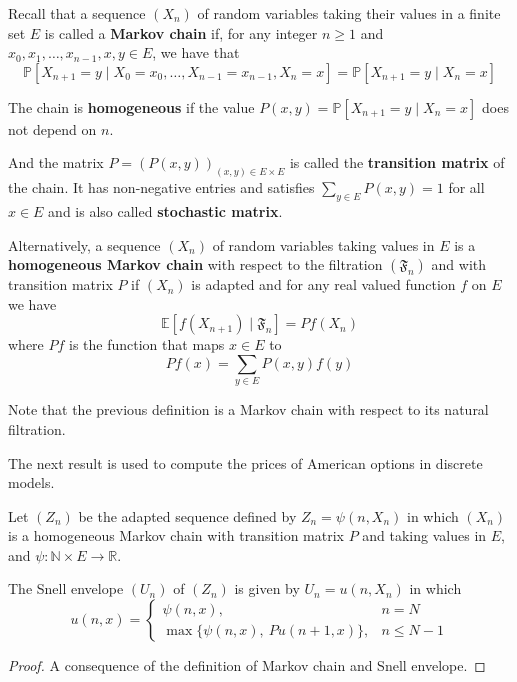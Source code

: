 Recall that a sequence $(X_n)$ of random variables taking their values in a finite set $E$ is called a \textbf{Markov chain} if, for any integer $n \ge 1$ and $x_0, x_1, \ldots, x_{n-1}, x, y \in E$, we have that 
\[
    \mathbb{P}[X_{n+1} = y \mid X_0 = x_0, \ldots, X_{n-1} = x_{n-1}, X_n = x] = \mathbb{P}[X_{n+1} = y \mid X_n = x]
\]

The chain is \textbf{homogeneous} if the value $P(x,y) = \mathbb{P}[X_{n+1} = y \mid X_n = x]$ does not depend on $n$.

And the matrix $P = (P(x,y))_{(x, y) \in E \times E}$ is called the \textbf{transition matrix} of the chain. It has non-negative entries and satisfies $\sum_{y \in E} P(x,y) = 1$ for all $x \in E$ and is also called \textbf{stochastic matrix}.

Alternatively, a sequence $(X_n)$ of random variables taking values in $E$ is a \textbf{homogeneous Markov chain} with respect to the filtration $(\mathfrak{F}_n)$ and with transition matrix $P$ if $(X_n)$ is adapted and for any real valued function $f$ on $E$ we have 
\[
    \mathbb{E}[f(X_{n+1}) \mid \mathfrak{F}_n] = Pf(X_n)
\]
where $Pf$ is the function that maps $x \in E$ to 
\[
    Pf(x) = \sum_{y \in E} P(x,y) f(y)
\]

Note that the previous definition is a Markov chain with respect to its natural filtration. 

The next result is used to compute the prices of American options in discrete models.

\begin{proposition}
    Let $(Z_n)$ be the adapted sequence defined by $Z_n = \psi(n, X_n)$ in which $(X_n)$ is a homogeneous Markov chain with transition matrix $P$ and taking values in $E$, and $\psi : \mathbb{N} \times E \longrightarrow \mathbb{R}$.

    The Snell envelope $(U_n)$ of $(Z_n)$ is given by $U_n = u(n, X_n)$ in which
    \begin{equation*}
        u(n, x) =
        \begin{cases}
            \psi(n, x), & n = N \\
            \max \{ \psi(n, x), ~Pu(n+1, x) \}, & n \le N-1
        \end{cases}
    \end{equation*}
\end{proposition}

\begin{proof}
    A consequence of the definition of Markov chain and Snell envelope.
\end{proof}

